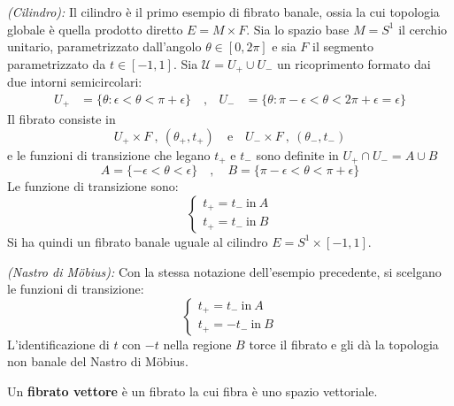 \begin{example}\emph{(Cilindro): }\label{ex:cilindro}
   Il cilindro è il primo esempio di fibrato banale, ossia la cui topologia globale
   è quella prodotto diretto $E = M\times F$. Sia lo spazio base $M=S^1$ il cerchio
   unitario, parametrizzato dall'angolo $\theta \in [0,2\pi]$ e sia $F$ il segmento
   parametrizzato da $t \in [-1,1]$. Sia $\mathcal{U} = U_+ \cup U_-$ un ricoprimento
   formato dai due intorni semicircolari:
   \begin{equation*}
      \begin{aligned}
         U_+ &= \{\theta : \epsilon < \theta < \pi + \epsilon \} \quad ,&
         U_- &= \{\theta : \pi - \epsilon < \theta < 2\pi + \epsilon = \epsilon \}
      \end{aligned}
   \end{equation*}
   Il fibrato consiste in
      $$ U_+ \times F \: , \: (\theta_+,t_+) \mathrm{\quad e \quad}
         U_- \times F \: , \: (\theta_-,t_-) $$
  e le funzioni di transizione che legano $t_+$ e $t_-$ sono definite in
  $U_+\cap U_- = A \cup B$
  $$ A = \{ -\epsilon < \theta < \epsilon \} \quad , \quad
     B = \{ \pi-\epsilon < \theta < \pi + \epsilon \} $$
  Le funzione di transizione sono:
  $$ \begin{cases}
     t_+= t_- \mathrm{\: in \:} A \\
     t_+= t_- \mathrm{\: in \:} B
  \end{cases}$$
  Si ha quindi un fibrato banale uguale al cilindro $E = S^1 \times [-1,1]$.\\
\end{example}

\begin{example}\emph{(Nastro di Möbius): }\label{ex:mobius}
   Con la stessa notazione dell'esempio precedente, si scelgano le funzioni di
   transizione:
   $$ \begin{cases}
      t_+= t_- \mathrm{\: in \:} A \\
      t_+= -t_- \mathrm{\: in \:} B
   \end{cases}$$
   L'identificazione di $t$ con $-t$ nella regione $B$ torce il fibrato e gli dà
   la topologia non banale del Nastro di Möbius.
\end{example}


Un \textbf{fibrato vettore} è un fibrato la cui fibra è uno spazio vettoriale.\\

